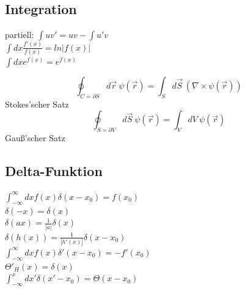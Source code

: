 \documentclass[12pt,a4paper, twoside]{article}
\renewcommand{\=}[1]{\stackrel{#1}{=}}
\theoremstyle{definition}
\theoremstyle{remark}
\begin{document}
\begin{center}
\begin{minipage}[t]{.49\linewidth}
\vspace{0pt}
\subsection{Integration}
partiell: $\int uv' = uv - \int u'v$\\
$\int dx \frac{f'(x)}{f(x)} = ln|f(x)|$\\
$\int dx e^{f(x)} = e^{f(x)}$

\begin{framed}
$$\oint_{C = \partial S} d\vec{r} ~ \psi(\vec{r}) = \int_{S} d\vec{S} ~ (\nabla \times \psi(\vec{r}))$$
\centering Stokes'scher Satz
$$\oint_{S = \partial V} d\vec{S} ~ \psi(\vec{r}) = \int_V dV ~ \psi(\vec{r})$$
\centering Gauß'scher Satz
\end{framed}

\end{minipage}%
\hspace{0.01\linewidth}
\begin{minipage}[t]{.49\linewidth}
\vspace{0pt}

\subsection{Delta-Funktion}
$\int_{-\infty}^{\infty} dx f(x) \delta(x-x_0) = f(x_0)$\\
$\delta(-x) = \delta(x)$\\
$\delta(ax) = \frac{1}{|a|} \delta(x)$\\
$\delta(h(x)) = \frac{1}{|h'(x)|} \delta(x-x_0)$\\
$\int_{-\infty}^{\infty} dx f(x) \delta'(x-x_0) = -f'(x_0)$\\
$\Theta'_H(x) = \delta(x)$\\
$\int_{-\infty}^{x} dx' \delta(x'-x_0) = \Theta(x-x_0)$\\

\end{minipage}
\end{center}
\end{document}
